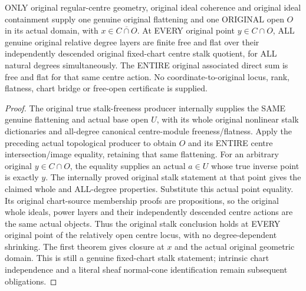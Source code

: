 \begin{theorem}
\label{hir:real-domain-original-relative-centre-open-all-stalk-degrees-free}
\leanok
ONLY original regular-centre geometry, original ideal coherence and original
ideal containment supply one genuine original flattening and one ORIGINAL
open $O$ in its actual domain, with $x\in\overline{C\cap O}$. At EVERY original
point $y\in C\cap O$, ALL genuine original relative degree layers are finite
free and flat over their independently descended original fixed-chart centre
stalk quotient, for ALL natural degrees simultaneously. The ENTIRE original
associated direct sum is free and flat for that same centre action. No
coordinate-to-original locus, rank, flatness, chart bridge or free-open
certificate is supplied.
\end{theorem}
\begin{proof}
The original true stalk-freeness producer internally supplies the SAME genuine
flattening and actual base open $U$, with its whole original nonlinear stalk
dictionaries and all-degree canonical centre-module freeness/flatness.
Apply the preceding actual topological producer to obtain $O$ and its ENTIRE
centre intersection/image equality, retaining that same flattening. For an
arbitrary original $y\in C\cap O$, the equality supplies an actual $a\in U$
whose true inverse point is exactly $y$. The internally proved original
stalk statement at that point gives the claimed whole and ALL-degree
properties. Substitute this actual point equality. Its original chart-source
membership proofs are propositions, so the original whole ideals, power
layers and their independently descended centre actions are the same
actual objects. Thus the original stalk conclusion holds at EVERY original
point of the relatively open centre locus, with no degree-dependent
shrinking. The first theorem gives closure at $x$ and the actual original
geometric domain. This is still a genuine fixed-chart stalk statement;
intrinsic chart independence and a literal sheaf normal-cone identification
remain subsequent obligations.
\end{proof}

